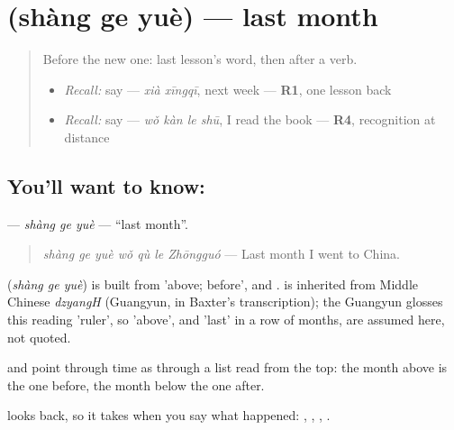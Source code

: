 \section[\texorpdfstring{\zh{上个月} (shàng ge yuè)}{上个月 (shàng ge yuè)}]{ (shàng ge yuè) — last month}

\label{lesson:ZH-C148-shang-ge-yue}



\begin{quote}
Before the new one: last lesson's word, then  after a verb.

\begin{itemize}
\raggedright
  \item \emph{Recall:} say  — \emph{xià xīngqī}, next week — \textbf{R1}, one lesson back
  \item \emph{Recall:} say  — \emph{wǒ kàn le shū}, I read the book — \textbf{R4}, recognition at distance
\end{itemize}
\end{quote}

\subsection*{You'll want to know: }
\textbf{} — \emph{shàng ge yuè} — \textquotedblleft{}last month\textquotedblright{}.

\begin{quote}
\textbf{} \emph{shàng ge yuè wǒ qù le Zhōngguó} — Last month I went to China.
\end{quote}

\begin{cousinweb}
\textbf{} (\emph{shàng ge yuè}) is built from  'above; before',  and .  is inherited from Middle Chinese \emph{dzyangH} (Guangyun, in Baxter's transcription); the Guangyun glosses this reading 'ruler', so 'above', and 'last' in a row of months, are assumed here, not quoted.
\end{cousinweb}

\begin{grammarlens}[title={What you've built}]
 and  point through time as through a list read from the top: the month above is the one before, the month below the one after.

 looks back, so it takes  when you say what happened: , , , .
\end{grammarlens}

